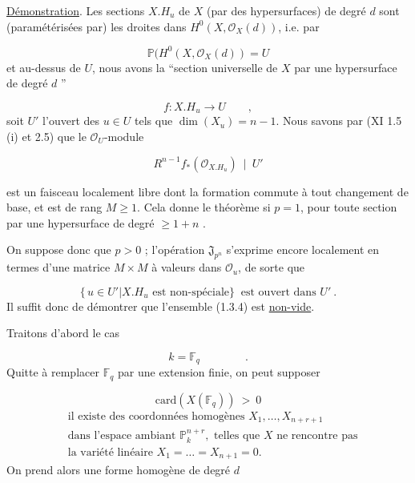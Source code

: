 \underline{Démonstration}. Les sections $X.H_u$ de $X$ (par des hypersurfaces) de degré $d$ sont (paramétérisées par) les droites dans $H^0(X,\mathcal{O}_X(d))$, i.e. par

\begin{equation}\tag{1.3.1}
\mathbb{P}(H^0(X,\mathcal{O}_X(d)) = U
\end{equation}
et au-dessus de $U$, nous avons la ``section universelle de $X$ par une hypersurface de degré $d$ ''

\begin{equation}\tag{1.3.2}
f : X.H_u \longrightarrow U \qquad ,
\end{equation}
soit $U'$ l'ouvert des $u \in U$ tels que $\dim(X_u) = n-1$. Nous savons par (XI 1.5 (i) et 2.5) que le $\mathcal{O}_U$-module

\begin{equation}\tag{1.3.3}
R^{n-1}f_*(\mathcal{O}_{X.H_u}) \ \mid \ U' 
\end{equation}


 est un faisceau localement libre dont la formation commute à tout changement de base, et est de rang $M \geq 1$. Cela donne le théorème si $p = 1$, pour toute section par une hypersurface de degré $\geq 1+n$ .

On suppose donc que $p > 0$ ; l'opération $\mathfrak{J}_{p^n}$ s'exprime encore localement en termes d'une matrice $M \times M$ à valeurs dans $\mathcal{O}_u$, de sorte que

\begin{equation}\tag{1.3.4}
\{ \, u \in U' | X.H_u \text{ est non-spéciale} \} \ \text{ est ouvert dans } U' \ .
\end{equation}
Il suffit donc de démontrer que l'ensemble (1.3.4) est \underline{non-vide}.

Traitons d'abord le cas

\begin{equation}\tag{1.3.5}
k = \mathbb{F}_q \qquad\qquad .
\end{equation}
Quitte à remplacer $\mathbb{F}_q$ par une extension finie, on peut supposer

\begin{equation}\tag{1.3.6}
\mathrm{card}(X(\mathbb{F}_q)) \ > \ 0
\end{equation}
\begin{equation}\tag{1.3.7}
\begin{aligned}
&\text{il existe des coordonnées homogènes } X_1,\dots,X_{n+r+1} \\
&\text{dans l'espace ambiant } \mathbb{P}^{n+r}_k, \text{ telles que } X \text{ ne rencontre pas} \\
&\text{la variété linéaire } X_1=\dots=X_{n+1}=0.
\end{aligned}
\end{equation}
On prend alors une forme homogène de degré $d$

